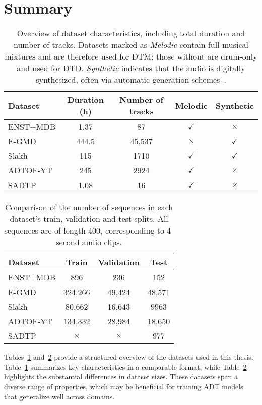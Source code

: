 \section{Summary}

\begin{table}[H]
    \centering
    \hspace*{-0.6cm}
    \begin{tabular}{l|cccc}
        Dataset & Duration (h) & Number of tracks & Melodic & Synthetic \\
        \hline
        ENST+MDB & 1.37 & 87 & $\checkmark$ & $\times$ \\
        E-GMD & 444.5 & 45,537 & $\times$ & $\checkmark$ \\
        Slakh & 115 & 1710 & $\checkmark$ & $\checkmark$ \\
        ADTOF-YT & 245 & 2924 & $\checkmark$ & $\times$ \\
        SADTP & 1.08 & 16 & $\checkmark$ & $\times$ \\
    \end{tabular}
    \caption{Overview of dataset characteristics, including total duration and number of tracks. Datasets marked as \textit{Melodic} contain full musical mixtures and are therefore used for \gls{DTM}; those without are drum-only and used for \gls{DTD}. \textit{Synthetic} indicates that the audio is digitally synthesized, often via automatic generation schemes~\cite{zehren2024analyzingreducingsynthetictorealtransfer}.}
    \label{DatasetSummaryTable}
\end{table}

\begin{table}[H]
    \centering
    \hspace*{-0.6cm}
    \begin{tabular}{l|ccc}
        Dataset & Train & Validation & Test \\
        \hline
        ENST+MDB & 896 & 236 & 152 \\
        E-GMD & 324,266 & 49,424 & 48,571 \\
        Slakh & 80,662 & 16,643 & 9963 \\
        ADTOF-YT & 134,332 & 28,984 & 18,650 \\
        SADTP & $\times$ & $\times$ & 977 \\
    \end{tabular}
    \caption{Comparison of the number of sequences in each dataset's train, validation and test splits. All sequences are of length 400, corresponding to 4-second audio clips.}
    \label{DatasetSplitSummaryTable}
\end{table}

Tables~\ref{DatasetSummaryTable} and~\ref{DatasetSplitSummaryTable} provide a structured overview of the datasets used in this thesis. Table~\ref{DatasetSummaryTable} summarizes key characteristics in a comparable format, while Table~\ref{DatasetSplitSummaryTable} highlights the substantial differences in dataset sizes. These datasets span a diverse range of properties, which may be beneficial for training \gls{ADT} models that generalize well across domains.